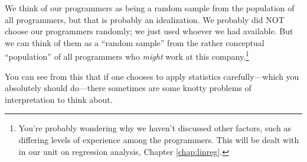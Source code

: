 We think of our programmers as being a random sample from the population
of all programmers, but that is probably an idealization.  We probably
did NOT choose our programmers randomly; we just used whoever we had
available.  But we can think of them as a ``random sample'' from the
rather conceptual ``population'' of all programmers who {\it might} work
at this company.\footnote{You're probably wondering why we haven't
discussed other factors, such as differing levels of experience among
the programmers.  This will be dealt with in our unit on regression
analysis, Chapter \ref{chap:linreg}.}


You can see from this that if one chooses to apply statistics
carefully---which you absolutely should do---there sometimes are some
knotty problems of interpretation to think about.



